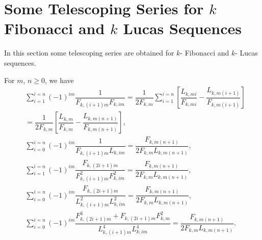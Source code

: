 \section{Some Telescoping Series for $k$ Fibonacci and $k$ Lucas Sequences}
In this section some telescoping series are obtained for $k$- Fibonacci and $k$- Lucas sequences.
\begin{theorem}
For  $m$, $n\geq 0$, we have
  \begin{align*}
   &\sum_{i=1}^{i=n}(-1)^{im}\dfrac{1}{F_{k,(i+1)m}F_{k,im}} =\dfrac{1}{2F_{k,m}} \sum_{i=1}^{i=n}\left[{\dfrac{L_{k,mi}}{F_{k,mi}}-\dfrac{L_{k,m(i+1)}}{F_{k,m(i+1)}}}\right]\\
  & = \dfrac{1}{2F_{k,m}}\left[\dfrac{L_{k,m}}{F_{k,m}}-\dfrac{L_{k,m(n+1)}}{F_{k,m(n+1)}}\right],\\
& \sum_{i=0}^{i=n}(-1)^{im}\dfrac{1}{F_{k,(i+1)m}L_{k,im}} = \dfrac{F_{k,m(n+1)}}{2F_{k,m}L_{k,m(n+1)}},\\
  & \sum_{i=1}^{i=n}(-1)^{im}\dfrac{F_{k,(2i+1)m}}{F_{k,(i+1)m}^2 F_{k,im}^2} = \dfrac{F_{k,m(n+1)}}{2F_{k,m}L_{k,m(n+1)}},\\
  & \sum_{i=0}^{i=n}(-1)^{im}\dfrac{F_{k,(2i+1)m}}{L_{k,(i+1)m}^2 L_{k,im}^2} = \dfrac{F_{k,m(n+1)}}{2F_{k,m}L_{k,m(n+1)}},\\
  & \sum_{i=0}^{i=n}(-1)^{im}\dfrac{F_{k,(2i+1)m}^3+ F_{k,(2i+1)m}F_{k,m}^2}{L_{k,(i+1)m}^4 L_{k,im}^4} = \dfrac{F_{k,m(n+1)}}{2F_{k,m}L_{k,m(n+1)}}.
 \end{align*}    
 \end{theorem}

